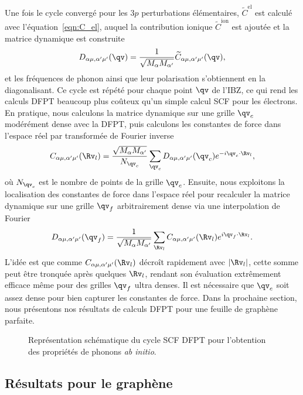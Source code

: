 Une fois le cycle convergé pour les $3p$ perturbations élémentaires, $\widetilde{C}^\text{el}$ est calculé avec l'équation~\eqref{eqn:C_el}, auquel la contribution ionique $\widetilde{C}^\text{ion}$ est ajoutée et la matrice dynamique est construite
\begin{equation}
    D_{\alpha\mu,\alpha'\mu'}(\qv)=\frac{1}{\sqrt{M_\alpha M_{\alpha'}}}\widetilde{C}_{\alpha\mu,\alpha'\mu'}(\qv),
\end{equation}
et les fréquences de phonon ainsi que leur polarisation s'obtiennent en la diagonalisant. Ce cycle est répété pour chaque point $\qv$ de l'IBZ, ce qui rend les calculs DFPT beaucoup plus coûteux qu'un simple calcul SCF pour les électrons. En pratique, nous calculons la matrice dynamique sur une grille $\qv_c$ modérément dense avec la DFPT, puis calculons les constantes de force dans l'espace réel par transformée de Fourier inverse
\begin{equation}
    C_{\alpha\mu,\alpha'\mu'}(\Rv_l) =\frac{\sqrt{M_\alpha M_{\alpha'}}}{N_{\qv_c}}\sum_{\qv_c}D_{\alpha\mu,\alpha'\mu'}(\qv_c)e^{-i\qv_c\cdot\Rv_l},
\end{equation}
où $N_{\qv_c}$ est le nombre de points de la grille $\qv_c$. Ensuite, nous exploitons la localisation des constantes de force dans l'espace réel pour recalculer la matrice dynamique sur une grille $\qv_f$ arbitrairement dense via une interpolation de Fourier
\begin{equation}
    D_{\alpha\mu,\alpha'\mu'}(\qv_f)=\frac{1}{\sqrt{M_\alpha M_{\alpha'}}}\sum_{\Rv_l}C_{\alpha\mu,\alpha'\mu'}(\Rv_l)e^{i\qv_f\cdot\Rv_l}.
\end{equation}
L'idée est que comme $C_{\alpha\mu,\alpha'\mu'}(\Rv_l)$ décroît rapidement avec $|\Rv_l|$, cette somme peut être tronquée après quelques $\Rv_l$, rendant son évaluation extrêmement efficace même pour des grilles $\qv_f$ ultra denses. Il est nécessaire que $\qv_c$ soit assez dense pour bien capturer les constantes de force. Dans la prochaine section, nous présentons nos résultats de calculs DFPT pour une feuille de graphène parfaite. 
\begin{figure}[t]
    \centering
    
    \caption[Représentation schématique du cycle SCF DFPT pour l'obtention des propriétés de phonons \textit{ab initio}.]{Représentation schématique du cycle SCF DFPT pour l'obtention des propriétés de phonons \textit{ab initio}.}
    \label{fig:scf_phonon}
\end{figure}

\subsection{Résultats pour le graphène}\label{sec:phonon_results}

